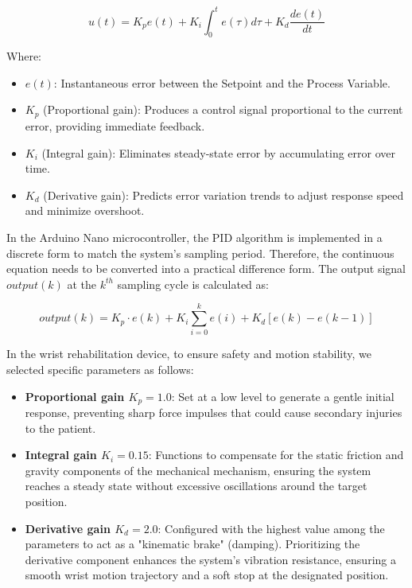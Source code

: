 \documentclass[conference]{IEEEtran}
\begin{document}
\begin{equation}
u(t) = K_p e(t) + K_i \int_0^t e(\tau)d\tau + K_d \frac{de(t)}{dt}
\label{eq:pid_continuous}
\end{equation}

Where:
\begin{itemize}
    \item $e(t)$: Instantaneous error between the Setpoint and the Process Variable.
    \item $K_p$ (Proportional gain): Produces a control signal proportional to the current error, providing immediate feedback.
    \item $K_i$ (Integral gain): Eliminates steady-state error by accumulating error over time.
    \item $K_d$ (Derivative gain): Predicts error variation trends to adjust response speed and minimize overshoot.
\end{itemize}

In the Arduino Nano microcontroller, the PID algorithm is implemented in a discrete form to match the system's sampling period. Therefore, the continuous equation needs to be converted into a practical difference form. The output signal $output(k)$ at the $k^{th}$ sampling cycle is calculated as:

\begin{equation}
output(k) = K_p \cdot e(k) + K_i \sum_{i=0}^k e(i) + K_d [e(k) - e(k-1)]
\label{eq:pid_discrete}
\end{equation}

In the wrist rehabilitation device, to ensure safety and motion stability, we selected specific parameters as follows:
\begin{itemize}
    \item \textbf{Proportional gain $K_p = 1.0$}: Set at a low level to generate a gentle initial response, preventing sharp force impulses that could cause secondary injuries to the patient.
    \item \textbf{Integral gain $K_i = 0.15$}: Functions to compensate for the static friction and gravity components of the mechanical mechanism, ensuring the system reaches a steady state without excessive oscillations around the target position.
    \item \textbf{Derivative gain $K_d = 2.0$}: Configured with the highest value among the parameters to act as a "kinematic brake" (damping). Prioritizing the derivative component enhances the system's vibration resistance, ensuring a smooth wrist motion trajectory and a soft stop at the designated position.
\end{itemize}
\end{document}
